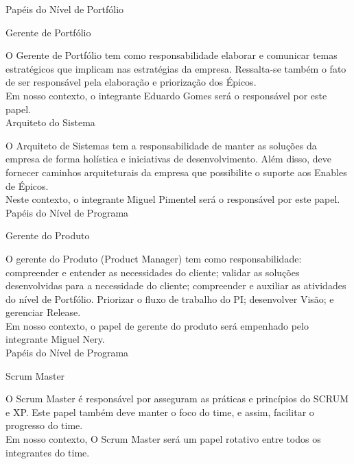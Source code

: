 \large{Papéis do Nível de Portfólio\\}


\large{Gerente de Portfólio\\}

\tab O Gerente de Portfólio tem como responsabilidade elaborar e comunicar temas estratégicos que implicam nas estratégias da empresa. Ressalta-se também o fato de ser responsável pela elaboração e priorização dos Épicos. \\
\tab Em nosso contexto, o integrante Eduardo Gomes será o responsável por este papel. \\


\large{Arquiteto do Sistema\\}

\tab O Arquiteto de Sistemas tem a responsabilidade de manter as soluções da empresa de forma holística e iniciativas de desenvolvimento. Além disso, deve fornecer caminhos arquiteturais da empresa que possibilite o suporte aos Enables de Épicos. \\
\tab Neste contexto, o integrante Miguel Pimentel será o responsável por este papel. \\

\large{Papéis do Nível de Programa\\}


\large{Gerente do Produto\\}

\tab O gerente do Produto (Product Manager)  tem como responsabilidade: compreender e entender as necessidades do cliente; validar as soluções desenvolvidas para a necessidade do cliente;  compreender e auxiliar as atividades do nível de Portfólio. Priorizar o fluxo de trabalho do PI; desenvolver Visão; e gerenciar Release. \\
\tab Em nosso contexto, o papel de gerente do produto será empenhado pelo integrante Miguel Nery. \\



\large{Papéis do Nível de Programa\\}

\large{Scrum Master\\}

\tab O Scrum Master é responsável por asseguram as práticas e princípios do SCRUM e XP. Este papel também deve manter o foco do time, e assim, facilitar o progresso do time. \\
\tab Em nosso contexto, O Scrum Master será um papel rotativo entre todos os integrantes do time. \\


